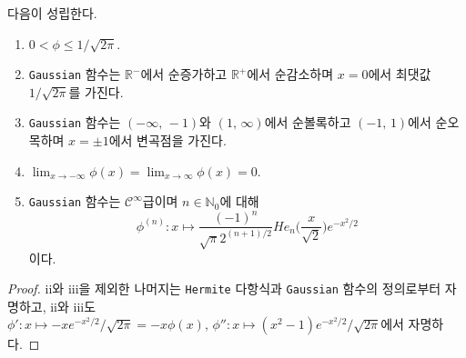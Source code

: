 \begin{theorem}
    다음이 성립한다.
    \begin{enumerate}
        \item $0<\phi\leq1/\sqrt{2\pi}$.
        \item \texttt{Gaussian} 함수는 $\mathbb{R}^-$에서 순증가하고 $\mathbb{R}^+$에서 순감소하며 $x=0$에서 최댓값 $1/\sqrt{2\pi}$를 가진다.
        \item \texttt{Gaussian} 함수는 $(-\infty,\,-1)$와 $(1,\,\infty)$에서 순볼록하고 $(-1,\,1)$에서 순오목하며 $x=\pm1$에서 변곡점을 가진다.
        \item $\lim_{x\to-\infty}\phi(x)=\lim_{x\to\infty}\phi(x)=0$.
        \item \texttt{Gaussian} 함수는 $\mathcal{C}^\infty$급이며 $n\in\mathbb{N}_0$에 대해
        \begin{equation*}
            \phi^{(n)}:x\mapsto\frac{(-1)^n}{\sqrt{\pi}2^{(n+1)/2}}He_n\bigg(\frac{x}{\sqrt{2}}\bigg)e^{-x^2/2}
        \end{equation*}
        이다.
    \end{enumerate}
\end{theorem}

\begin{proof}
    ii와 iii을 제외한 나머지는 \texttt{Hermite} 다항식과 \texttt{Gaussian} 함수의 정의로부터 자명하고, ii와 iii도 $\phi':x\mapsto-xe^{-x^2/2}/\sqrt{2\pi}=-x\phi(x),\,\phi'':x\mapsto(x^2-1)e^{-x^2/2}/\sqrt{2\pi}$에서 자명하다.
\end{proof}

